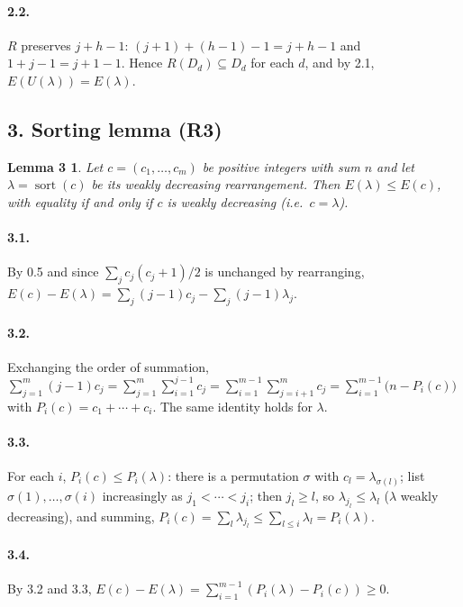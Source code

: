 \documentclass[11pt]{article}
\newtheorem*{lemmathree}{Lemma 3}
\begin{document}
\paragraph{2.2.} $R$ preserves $j+h-1$: $(j+1)+(h-1)-1=j+h-1$ and $1+j-1=j+1-1$. Hence $R(D_d)\subseteq D_d$ for
each $d$, and by 2.1, $E(U(\lambda))=E(\lambda)$.

\subsection*{3. Sorting lemma (R3)}

\begin{lemmathree}
Let $c=(c_1,\ldots,c_m)$ be positive integers with sum $n$ and let $\lambda=\operatorname{sort}(c)$ be its
weakly decreasing rearrangement. Then $E(\lambda)\le E(c)$, with equality if and only if $c$ is weakly
decreasing (i.e.\ $c=\lambda$).
\end{lemmathree}

\paragraph{3.1.} By 0.5 and since $\sum_j c_j(c_j+1)/2$ is unchanged by rearranging,
$E(c)-E(\lambda)=\sum_j(j-1)c_j-\sum_j(j-1)\lambda_j$.

\paragraph{3.2.} Exchanging the order of summation,
$\sum_{j=1}^m (j-1)c_j=\sum_{j=1}^m\sum_{i=1}^{j-1}c_j=\sum_{i=1}^{m-1}\sum_{j=i+1}^m c_j=\sum_{i=1}^{m-1}\bigl(n-P_i(c)\bigr)$
with $P_i(c)=c_1+\cdots+c_i$. The same identity holds for $\lambda$.

\paragraph{3.3.} For each $i$, $P_i(c)\le P_i(\lambda)$: there is a permutation $\sigma$ with
$c_l=\lambda_{\sigma(l)}$; list $\sigma(1),\ldots,\sigma(i)$ increasingly as $j_1<\cdots<j_i$; then $j_l\ge l$, so
$\lambda_{j_l}\le\lambda_l$ ($\lambda$ weakly decreasing), and summing,
$P_i(c)=\sum_l\lambda_{j_l}\le\sum_{l\le i}\lambda_l=P_i(\lambda)$.

\paragraph{3.4.} By 3.2 and 3.3, $E(c)-E(\lambda)=\sum_{i=1}^{m-1}(P_i(\lambda)-P_i(c))\ge0$.
\end{document}
